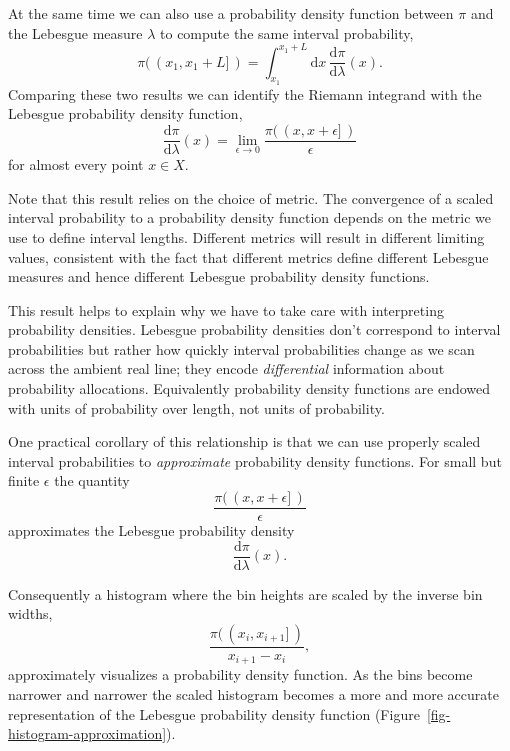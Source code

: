 \documentclass[
  letterpaper,
  DIV=11,
  numbers=noendperiod]{scrartcl}
\begin{document}
At the same time we can also use a probability density function between
\(\pi\) and the Lebesgue measure \(\lambda\) to compute the same
interval probability, \[
\pi( \, ( x_{1}, x_{1} + L ] \, ) =
\int_{x_{1}}^{x_{1} + L} \mathrm{d} x \,
\frac{ \mathrm{d} \pi }{ \mathrm{d} \lambda }(x).
\] Comparing these two results we can identify the Riemann integrand
with the Lebesgue probability density function, \[
\frac{ \mathrm{d} \pi }{ \mathrm{d} \lambda }(x)
= \lim_{\epsilon \rightarrow 0}
\frac{ \pi( \, ( x, x + \epsilon ] \, ) }{ \epsilon }
\] for almost every point \(x \in X\).

Note that this result relies on the choice of metric. The convergence of
a scaled interval probability to a probability density function depends
on the metric we use to define interval lengths. Different metrics will
result in different limiting values, consistent with the fact that
different metrics define different Lebesgue measures and hence different
Lebesgue probability density functions.

This result helps to explain why we have to take care with interpreting
probability densities. Lebesgue probability densities don't correspond
to interval probabilities but rather how quickly interval probabilities
change as we scan across the ambient real line; they encode
\emph{differential} information about probability allocations.
Equivalently probability density functions are endowed with units of
probability over length, not units of probability.

One practical corollary of this relationship is that we can use properly
scaled interval probabilities to \emph{approximate} probability density
functions. For small but finite \(\epsilon\) the quantity \[
\frac{ \pi( \, ( x, x + \epsilon ] \, ) }{ \epsilon }
\] approximates the Lebesgue probability density \[
\frac{ \mathrm{d} \pi }{ \mathrm{d} \lambda }(x).
\]

Consequently a histogram where the bin heights are scaled by the inverse
bin widths, \[
\frac{ \pi( \, ( x_{i}, x_{i + 1} ] \, ) }{ x_{i + 1} - x_{i} },
\] approximately visualizes a probability density function. As the bins
become narrower and narrower the scaled histogram becomes a more and
more accurate representation of the Lebesgue probability density
function (Figure~\ref{fig-histogram-approximation}).
\end{document}
